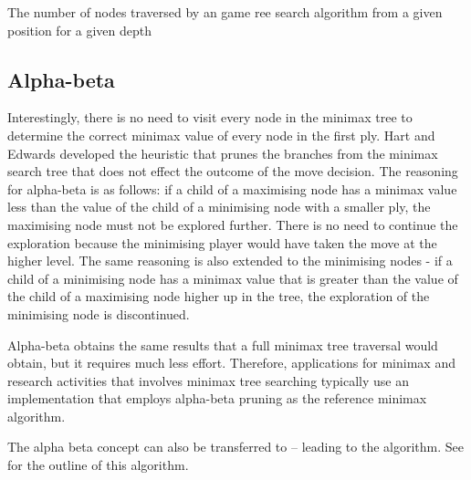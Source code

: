  {The number of nodes traversed by an game ree search algorithm from a given position for a given depth}

\subsection{Alpha-beta}
Interestingly, there is no need to visit every node in the minimax tree to determine the correct minimax value of every node in the first ply.  Hart and Edwards \cite{hart:alpha} developed the  heuristic that prunes the branches from the minimax search tree that does not effect the outcome of the move decision.  The reasoning for alpha-beta is as follows: if a child of a maximising node has a minimax value less than the value of the child of a minimising node with a smaller ply, the maximising node must not be explored further.  There is no need to continue the exploration because the minimising player would have taken the move at the higher level.  The same reasoning is also extended to the minimising nodes - if a child of a minimising node has a minimax value that is greater than the value of the child of a maximising node higher up in the tree, the exploration of the minimising node is discontinued.     

Alpha-beta obtains the same results that a full minimax tree traversal would obtain, but it requires much less effort. Therefore, applications for minimax and research activities that involves minimax tree searching typically use an implementation that employs alpha-beta pruning as the reference minimax algorithm.   

The alpha beta concept can also be transferred to  -- leading to the  algorithm. See  for the outline of this algorithm.   %

